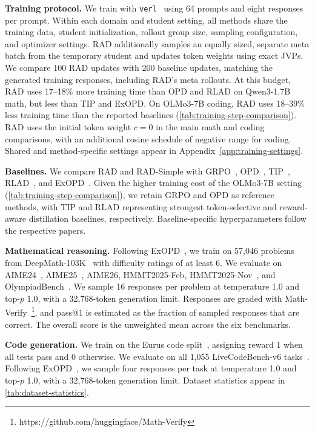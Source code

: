 \documentclass{article} %
\begin{document}
\noindent\textbf{Training protocol.}\enspace
We train with \texttt{verl}~\citep{sheng2025hybridflow} using 64 prompts and eight responses per prompt. Within each domain and student setting, all methods share the training data, student initialization, rollout group size, sampling configuration, and optimizer settings. RAD additionally samples an equally sized, separate meta batch from the temporary student and updates token weights using exact JVPs. We compare 100 RAD updates with 200 baseline updates, matching the generated training responses, including RAD's meta rollouts. At this budget, RAD uses 17--18\% more training time than OPD and RLAD on Qwen3-1.7B math, but less than TIP and ExOPD. On OLMo3-7B coding, RAD uses 18--39\% less training time than the reported baselines (\cref{tab:training-step-comparison}). RAD uses the initial token weight \(c=0\) in the main math and coding comparisons, with an additional cosine schedule of negative range for coding. Shared and method-specific settings appear in Appendix~\ref{app:training-settings}.

\noindent\textbf{Baselines.}\enspace
We compare RAD and RAD-Simple with GRPO~\citep{shao2024deepseekmath}, OPD~\citep{agarwal2024policy}, TIP~\citep{xu2026tip}, RLAD~\citep{zhang2026reinforcement}, and ExOPD~\citep{yang2026learning}. Given the higher training cost of the OLMo3-7B setting (\cref{tab:training-step-comparison}), we retain GRPO and OPD as reference methods, with TIP and RLAD representing strongest token-selective and reward-aware distillation baselines, respectively. Baseline-specific hyperparameters follow the respective papers.

\noindent\textbf{Mathematical reasoning.}\enspace
Following ExOPD~\citep{yang2026learning}, we train on 57,046 problems from DeepMath-103K~\citep{he2025deepmath} with difficulty ratings of at least 6. We evaluate on AIME24~\citep{Aime2024}, AIME25~\citep{Aime2025}, AIME26, HMMT2025-Feb, HMMT2025-Nov~\citep{balunovic2026matharena}, and OlympiadBench~\citep{he2024olympiadbench}. We sample 16 responses per problem at temperature 1.0 and top-\(p\) 1.0, with a 32,768-token generation limit. Responses are graded with Math-Verify~\footnote{https://github.com/huggingface/Math-Verify}, and pass@1 is estimated as the fraction of sampled responses that are correct. The overall score is the unweighted mean across the six benchmarks.

\noindent\textbf{Code generation.}\enspace
We train on the Eurus code split~\citep{cui2025process}, assigning reward 1 when all tests pass and 0 otherwise. We evaluate on all 1,055 LiveCodeBench-v6 tasks~\citep{jain2025livecodebench}. Following ExOPD~\citep{yang2026learning}, we sample four responses per task at temperature 1.0 and top-\(p\) 1.0, with a 32,768-token generation limit. Dataset statistics appear in \cref{tab:dataset-statistics}.
\end{document}
